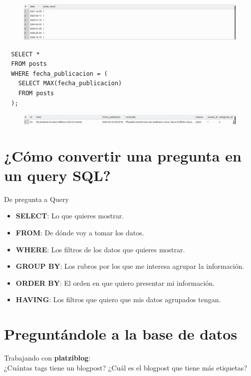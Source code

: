 \documentclass{article}
\begin{document}
\begin{figure}[h!]
  \centering
  \includegraphics[scale=0.5]{./Pictures/133_select_anidado.png}
\end{figure}

\begin{verbatim}
  SELECT *
  FROM posts
  WHERE fecha_publicacion = (
    SELECT MAX(fecha_publicacion)
    FROM posts
  );
\end{verbatim}

\begin{figure}[h!]
  \centering
  \includegraphics[scale=0.5]{./Pictures/134_where_anidado.png}
\end{figure}


\section{¿Cómo convertir una pregunta en un query SQL?}%
De pregunta a Query
\begin{itemize}
  \item \textbf{SELECT}: Lo que quieres mostrar.
  \item \textbf{FROM}: De dónde voy a tomar los datos.
  \item \textbf{WHERE}: Los filtros de los datos que quieres mostrar.
  \item \textbf{GROUP BY}: Los rubros por los que me interesa agrupar la información.
  \item \textbf{ORDER BY}: El orden en que quiero presentar mi información.
  \item \textbf{HAVING}: Los filtros que quiero que mis datos agrupados tengan.
\end{itemize}

\section{Preguntándole a la base de datos}%
Trabajando con \textbf{platziblog}:\\

¿Cuántas tags tiene un blogpost? ¿Cuál es el blogpost que tiene más etiquetas?\\
\end{document}
